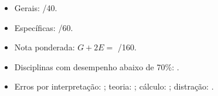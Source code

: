 \begin{itemize}
\item Gerais: \underline{\hspace{2cm}}/40.
\item Específicas: \underline{\hspace{2cm}}/60.
\item Nota ponderada: $G+2E=$ \underline{\hspace{2.5cm}}/160.
\item Disciplinas com desempenho abaixo de 70\%: \underline{\hspace{8cm}}.
\item Erros por interpretação: \underline{\hspace{1.5cm}}; teoria: \underline{\hspace{1.5cm}}; cálculo: \underline{\hspace{1.5cm}}; distração: \underline{\hspace{1.5cm}}.
\end{itemize}
